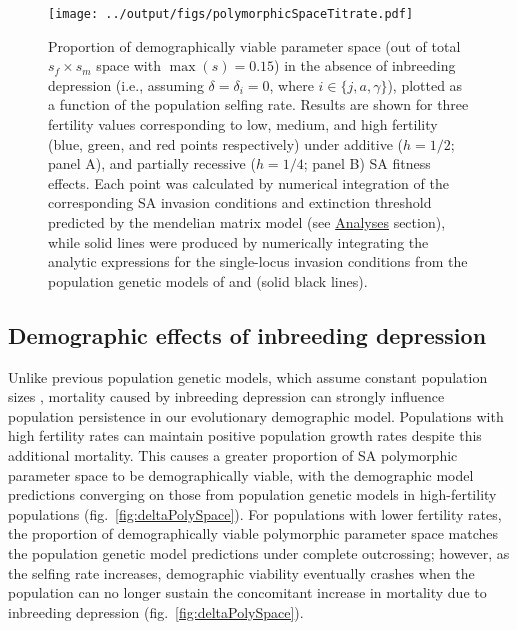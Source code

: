 \documentclass[11pt,draft]{article}
\begin{document}
 \begin{figure}[htbp]
 \centering
 \texttt{[image: ../output/figs/polymorphicSpaceTitrate.pdf]}
 \caption{\footnotesize{Proportion of demographically viable parameter space (out of total $s_f \times s_m$ space with $\max(s) = 0.15$) in the absence of inbreeding depression (i.e., assuming $\delta = \delta_i = 0$, where $i \in \{j,a,\gamma\}$), plotted as a function of the population selfing rate. Results are shown for three fertility values corresponding to low, medium, and high fertility (blue, green, and red points respectively) under additive ($h = 1/2$; panel A), and partially recessive ($h = 1/4$; panel B) SA fitness effects. Each point was calculated by numerical integration of the corresponding SA invasion conditions and extinction threshold predicted by the mendelian matrix model (see \hyperref[subsec:analyses]{Analyses} section), while solid lines were produced by numerically integrating the analytic expressions for the single-locus invasion conditions from the population genetic models of \citet{JordanConnallon2014} and \citet{Olito2017} (solid black lines).}} 
 \label{fig:polySpace}
 \end{figure}



\subsection*{Demographic effects of inbreeding depression} \label{subsec:InbreedEffects}

Unlike previous population genetic models, which assume constant population sizes \citep{JordanConnallon2014,Olito2017}, mortality caused by inbreeding depression can strongly influence population persistence in our evolutionary demographic model. Populations with high fertility rates can maintain positive population growth rates despite this additional mortality. This causes a greater proportion of SA polymorphic parameter space to be demographically viable, with the demographic model predictions converging on those from population genetic models in high-fertility populations (fig.~\ref{fig:deltaPolySpace}). For populations with lower fertility rates, the proportion of demographically viable polymorphic parameter space matches the population genetic model predictions under complete outcrossing; however, as the selfing rate increases, demographic viability eventually crashes when the population can no longer sustain the concomitant increase in mortality due to inbreeding depression (fig.~\ref{fig:deltaPolySpace}). 
\end{document}
